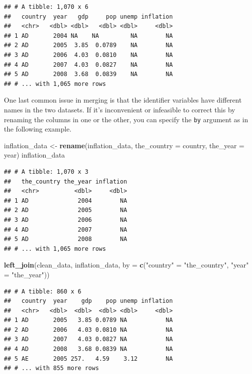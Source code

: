 \documentclass[
  12pt,
  oneside,openany]{book}
\newenvironment{Shaded}{\begin{snugshade}}{\end{snugshade}}
\newcommand{\DataTypeTok}[1]{\textcolor[rgb]{0.13,0.29,0.53}{#1}}
\newcommand{\KeywordTok}[1]{\textcolor[rgb]{0.13,0.29,0.53}{\textbf{#1}}}
\newcommand{\NormalTok}[1]{#1}
\newcommand{\StringTok}[1]{\textcolor[rgb]{0.31,0.60,0.02}{#1}}
\begin{document}
\begin{verbatim}
## # A tibble: 1,070 x 6
##   country  year   gdp     pop unemp inflation
##   <chr>   <dbl> <dbl>   <dbl> <dbl>     <dbl>
## 1 AD       2004 NA    NA         NA        NA
## 2 AD       2005  3.85  0.0789    NA        NA
## 3 AD       2006  4.03  0.0810    NA        NA
## 4 AD       2007  4.03  0.0827    NA        NA
## 5 AD       2008  3.68  0.0839    NA        NA
## # ... with 1,065 more rows
\end{verbatim}

One last common issue in merging is that the identifier variables have different names in the two datasets. If it's inconvenient or infeasible to correct this by renaming the columns in one or the other, you can specify the \texttt{by} argument as in the following example.

\begin{Shaded}
\begin{Highlighting}[]
\NormalTok{inflation\_data <{-}}\StringTok{ }\KeywordTok{rename}\NormalTok{(inflation\_data,}
                         \DataTypeTok{the\_country =}\NormalTok{ country,}
                         \DataTypeTok{the\_year =}\NormalTok{ year)}
\NormalTok{inflation\_data}
\end{Highlighting}
\end{Shaded}

\begin{verbatim}
## # A tibble: 1,070 x 3
##   the_country the_year inflation
##   <chr>          <dbl>     <dbl>
## 1 AD              2004        NA
## 2 AD              2005        NA
## 3 AD              2006        NA
## 4 AD              2007        NA
## 5 AD              2008        NA
## # ... with 1,065 more rows
\end{verbatim}

\begin{Shaded}
\begin{Highlighting}[]
\KeywordTok{left\_join}\NormalTok{(clean\_data,}
\NormalTok{          inflation\_data,}
          \DataTypeTok{by =} \KeywordTok{c}\NormalTok{(}\StringTok{"country"}\NormalTok{ =}\StringTok{ "the\_country"}\NormalTok{, }\StringTok{"year"}\NormalTok{ =}\StringTok{ "the\_year"}\NormalTok{))}
\end{Highlighting}
\end{Shaded}

\begin{verbatim}
## # A tibble: 860 x 6
##   country  year    gdp    pop unemp inflation
##   <chr>   <dbl>  <dbl>  <dbl> <dbl>     <dbl>
## 1 AD       2005   3.85 0.0789 NA           NA
## 2 AD       2006   4.03 0.0810 NA           NA
## 3 AD       2007   4.03 0.0827 NA           NA
## 4 AD       2008   3.68 0.0839 NA           NA
## 5 AE       2005 257.   4.59    3.12        NA
## # ... with 855 more rows
\end{verbatim}
\end{document}
